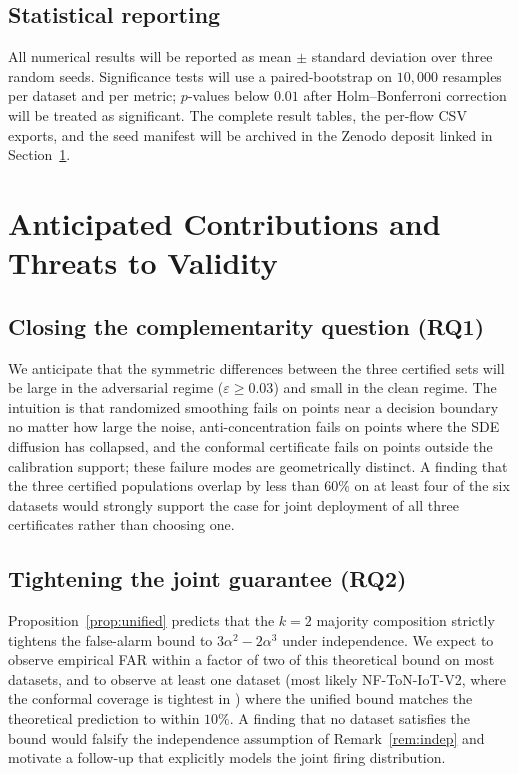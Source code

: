 \documentclass[journal,twoside]{IEEEtran}
\begin{document}
\subsection{Statistical reporting}
All numerical results will be reported as mean $\pm$ standard deviation
over three random seeds. Significance tests will use a
paired-bootstrap on $10{,}000$ resamples per dataset and per metric;
$p$-values below $0.01$ after Holm--Bonferroni correction will be
treated as significant. The complete result tables, the per-flow CSV
exports, and the seed manifest will be archived in the Zenodo deposit
linked in Section~\ref{sec:contributions}.

\section{Anticipated Contributions and Threats to Validity}\label{sec:contributions}

\subsection{Closing the complementarity question (RQ1)}
We anticipate that the symmetric differences between the three
certified sets will be large in the adversarial regime
($\varepsilon \ge 0.03$) and small in the clean regime. The intuition
is that randomized smoothing fails on points near a decision boundary
no matter how large the noise, anti-concentration fails on points where
the SDE diffusion has collapsed, and the conformal certificate fails on
points outside the calibration support; these failure modes are
geometrically distinct. A finding that the three certified populations
overlap by less than $60\%$ on at least four of the six datasets would
strongly support the case for joint deployment of all three
certificates rather than choosing one.

\subsection{Tightening the joint guarantee (RQ2)}
Proposition~\ref{prop:unified} predicts that the $k=2$ majority
composition strictly tightens the false-alarm bound to
$3\alpha^2 - 2\alpha^3$ under independence. We expect to observe
empirical FAR within a factor of two of this theoretical bound on most
datasets, and to observe at least one dataset (most likely
NF-ToN-IoT-V2, where the conformal coverage is tightest in
\cite{anaedevha2026sslgraph}) where the unified bound matches the
theoretical prediction to within $10\%$. A finding that no dataset
satisfies the bound would falsify the independence assumption of
Remark~\ref{rem:indep} and motivate a follow-up that explicitly models
the joint firing distribution.
\end{document}
